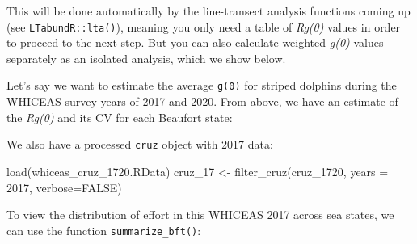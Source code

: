 \documentclass[
]{book}
\newenvironment{Shaded}{\begin{snugshade}}{\end{snugshade}}
\newcommand{\AttributeTok}[1]{\textcolor[rgb]{0.77,0.63,0.00}{#1}}
\newcommand{\ConstantTok}[1]{\textcolor[rgb]{0.00,0.00,0.00}{#1}}
\newcommand{\DecValTok}[1]{\textcolor[rgb]{0.00,0.00,0.81}{#1}}
\newcommand{\FloatTok}[1]{\textcolor[rgb]{0.00,0.00,0.81}{#1}}
\newcommand{\FunctionTok}[1]{\textcolor[rgb]{0.00,0.00,0.00}{#1}}
\newcommand{\NormalTok}[1]{#1}
\newcommand{\OtherTok}[1]{\textcolor[rgb]{0.56,0.35,0.01}{#1}}
\newcommand{\SpecialCharTok}[1]{\textcolor[rgb]{0.00,0.00,0.00}{#1}}
\newcommand{\StringTok}[1]{\textcolor[rgb]{0.31,0.60,0.02}{#1}}
\begin{document}
This will be done automatically by the line-transect analysis functions coming up (see \texttt{LTabundR::lta()}), meaning you only need a table of \emph{Rg(0)} values in order to proceed to the next step. But you can also calculate weighted \emph{g(0)} values separately as an isolated analysis, which we show below.

Let's say we want to estimate the average \texttt{g(0)} for striped dolphins during the WHICEAS survey years of 2017 and 2020. From above, we have an estimate of the \emph{Rg(0)} and its CV for each Beaufort state:

\begin{Shaded}
\end{Shaded}

We also have a processed \texttt{cruz} object with 2017 data:

\begin{Shaded}
\begin{Highlighting}[]
\FunctionTok{load}\NormalTok{(}\StringTok{\textquotesingle{}whiceas\_cruz\_1720.RData\textquotesingle{}}\NormalTok{)}
\NormalTok{cruz\_17 }\OtherTok{\textless{}{-}} \FunctionTok{filter\_cruz}\NormalTok{(cruz\_1720, }\AttributeTok{years =} \DecValTok{2017}\NormalTok{, }\AttributeTok{verbose=}\ConstantTok{FALSE}\NormalTok{)}
\end{Highlighting}
\end{Shaded}

To view the distribution of effort in this WHICEAS 2017 across sea states, we can use the function \texttt{summarize\_bft()}:
\end{document}
